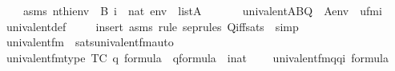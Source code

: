 \begin{isabellebody}
\ \ \ \ asms{\isacharcolon}{\kern0pt}\ {\isachardoublequoteopen}nth{\isacharparenleft}{\kern0pt}i{\isacharcomma}{\kern0pt}env{\isacharparenright}{\kern0pt}\ {\isacharequal}{\kern0pt}\ B{\isachardoublequoteclose}\ {\isachardoublequoteopen}i\ {\isasymin}\ nat{\isachardoublequoteclose}\ {\isachardoublequoteopen}env\ {\isasymin}\ list{\isacharparenleft}{\kern0pt}A{\isacharparenright}{\kern0pt}{\isachardoublequoteclose}\isanewline
\ \ \isanewline
\ \ \ \ {\isachardoublequoteopen}univalent{\isacharparenleft}{\kern0pt}{\isacharhash}{\kern0pt}{\isacharhash}{\kern0pt}A{\isacharcomma}{\kern0pt}B{\isacharcomma}{\kern0pt}Q{\isacharparenright}{\kern0pt}\ {\isasymlongleftrightarrow}\ A{\isacharcomma}{\kern0pt}env\ {\isasymTurnstile}\ {\isacharquery}{\kern0pt}ufm{\isacharparenleft}{\kern0pt}i{\isacharparenright}{\kern0pt}{\isachardoublequoteclose}\isanewline
%
\isadelimproof
\ \ %
\endisadelimproof
%
\isatagproof
{}\isamarkupfalse%
\ univalent{\isacharunderscore}{\kern0pt}def\ \isanewline
\ \ \isamarkupfalse%
\ {\isacharparenleft}{\kern0pt}insert\ asms{\isacharsemicolon}{\kern0pt}\ {\isacharparenleft}{\kern0pt}rule\ sep{\isacharunderscore}{\kern0pt}rules\ Q{\isacharunderscore}{\kern0pt}iff{\isacharunderscore}{\kern0pt}sats\ {\isacharbar}{\kern0pt}\ simp{\isacharparenright}{\kern0pt}{\isacharplus}{\kern0pt}{\isacharparenright}{\kern0pt}%
\endisatagproof
{\isafoldproof}%
%
\isadelimproof
\isanewline
%
\endisadelimproof
%
\isadelimML
\ \ \isanewline
%
\endisadelimML
%
\isatagML
{}\isamarkupfalse%
\ {\isachardoublequoteopen}univalent{\isacharunderscore}{\kern0pt}fm{\isachardoublequoteclose}\ \ sats{\isacharunderscore}{\kern0pt}univalent{\isacharunderscore}{\kern0pt}fm{\isacharunderscore}{\kern0pt}auto%
\endisatagML
{\isafoldML}%
%
\isadelimML
\isanewline
%
\endisadelimML
\isanewline
{}\isamarkupfalse%
\ univalent{\isacharunderscore}{\kern0pt}fm{\isacharunderscore}{\kern0pt}type\ {\isacharbrackleft}{\kern0pt}TC{\isacharbrackright}{\kern0pt}{\isacharcolon}{\kern0pt}\ {\isachardoublequoteopen}q{}{\isasymin}\ formula\ {\isasymLongrightarrow}\ q{}{\isasymin}formula\ {\isasymLongrightarrow}\ i{\isasymin}nat\ {\isasymLongrightarrow}\ \isanewline
\ \ univalent{\isacharunderscore}{\kern0pt}fm{\isacharparenleft}{\kern0pt}q{}{\isacharcomma}{\kern0pt}q{}{\isacharcomma}{\kern0pt}i{\isacharparenright}{\kern0pt}\ {\isasymin}formula{\isachardoublequoteclose}\isanewline

\end{isabellebody}
